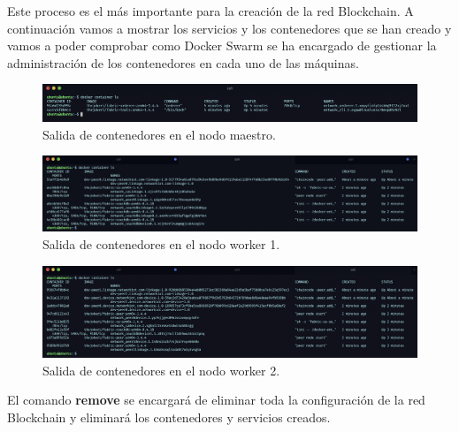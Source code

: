 \noindent Este proceso es el más importante para la creación de la red Blockchain. A continuación vamos a mostrar los 
servicios y los contenedores que se han creado y vamos a poder comprobar como Docker Swarm se ha encargado de gestionar 
la administración de los contenedores en cada uno de las máquinas.

\begin{figure}[ht!]
  \centering
  \includegraphics[width=\textwidth]{imagenes/desarrollo/comandos/containers_master}
  \caption{Salida de contenedores en el nodo maestro.}
  \label{fig:containers-master}
\end{figure}

\begin{figure}[ht!]
  \centering
  \includegraphics[width=\textwidth]{imagenes/desarrollo/comandos/containers_worker1}
  \caption{Salida de contenedores en el nodo worker 1.}
  \label{fig:containers-worker1}
\end{figure}

\begin{figure}[ht!]
  \centering
  \includegraphics[width=\textwidth]{imagenes/desarrollo/comandos/containers_worker2}
  \caption{Salida de contenedores en el nodo worker 2.}
  \label{fig:containers-worker2}
\end{figure}

\noindent El comando \textbf{remove} se encargará de eliminar toda la configuración de la red Blockchain y eliminará los 
contenedores y servicios creados.


